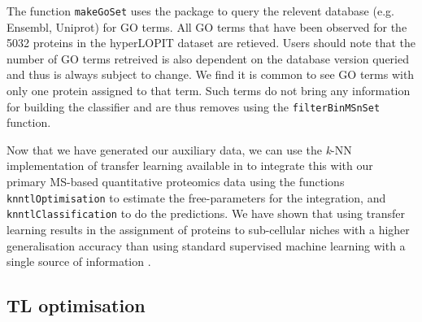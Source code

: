 The function \texttt{makeGoSet} uses the  package to
query the relevent database (e.g. Ensembl, Uniprot) for GO terms. All
GO terms that have been observed for the 5032 proteins in the
hyperLOPIT dataset are retieved. Users should note that the number of
GO terms retreived is also dependent on the database version queried
and thus is always subject to change. We find it is common to see GO
terms with only one protein assigned to that term. Such terms do not
bring any information for building the classifier and are thus removes
using the \texttt{filterBinMSnSet} function.

\begin{knitrout}
\color{fgcolor}\begin{kframe}
\begin{alltt}
 \hlkwb{<-} 
\end{alltt}
\end{kframe}
\end{knitrout}

Now that we have generated our auxiliary data, we can use the
\textit{k}-NN implementation of transfer learning available in
 to integrate this with our primary MS-based
quantitative proteomics data using the functions
\texttt{knntlOptimisation} to estimate the free-parameters for the
integration, and \texttt{knntlClassification} to do the
predictions. We have shown that using transfer learning results in the
assignment of proteins to sub-cellular niches with a higher
generalisation accuracy than using standard supervised machine
learning with a single source of information \cite{Breckels:2016}.

\subsection*{TL optimisation}

